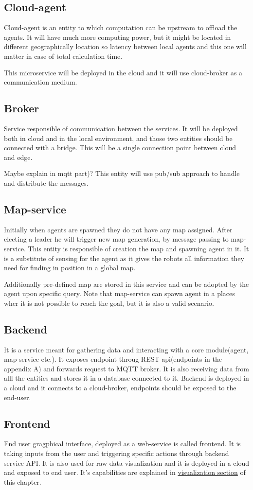 \subsection{Cloud-agent}
Cloud-agent is an entity to which computation can be upstream to offload the agents. It will have much more computing power, but it might be located in different geographically location so latency between local agents and this one will matter in case of total calculation time.

This microservice will be deployed in the cloud and it will use cloud-broker as a communication medium.

\subsection{Broker}
Service responsible of communication between the services. It will be deployed both in cloud and in the local environment, and those two entities should be connected with a bridge. This will be a single connection point between cloud and edge.

{\color{red}Maybe explain in mqtt part)?}
This entity will use pub/sub approach to handle and distribute the messages.

\subsection{Map-service}
Initially when agents are spawned they do not have any map assigned. After electing a leader he will trigger new map generation, by message passing to map-service. This entity is responsible of creation the map and spawning agent in it. It is a substitute of sensing for the agent as it gives the robots all information they need for finding in position in a global map.

Additionally pre-defined map are stored in this service and can be adopted by the agent upon specific query. Note that map-service can spawn agent in a places wher it is not possible to reach the goal, but it is also a valid scenario.

\subsection{Backend}
It is a service meant for gathering data and interacting with a core module(agent, map-service etc.). It exposes endpoint throug REST api(endpoints in the appendix A) and forwards request to MQTT broker. It is also receiving data from alll the entities and stores it in a database connected to it. Backend is deployed in a cloud and it connects to a cloud-broker, endpoints should be exposed to the end-user.

\subsection{Frontend}
End user gragphical interface, deployed as a web-service is called frontend. It is taking inputs from the user and triggering specific actions through backend service API. It is also used for raw data visualization and it is deployed in a cloud and exposed to end user. It's capabilities are explained in \hyperref[sec:0308]{visualization section} of this chapter.